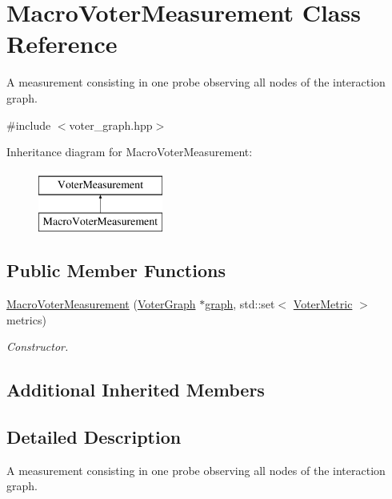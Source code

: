 \hypertarget{classMacroVoterMeasurement}{\section{Macro\-Voter\-Measurement Class Reference}
\label{classMacroVoterMeasurement}
}


A measurement consisting in one probe observing all nodes of the interaction graph.  




{\ttfamily \#include $<$voter\-\_\-graph.\-hpp$>$}

Inheritance diagram for Macro\-Voter\-Measurement\-:\begin{figure}[H]
\begin{center}
\leavevmode
\includegraphics[height=2.000000cm]{classMacroVoterMeasurement}
\end{center}
\end{figure}
\subsection*{Public Member Functions}
\begin{DoxyCompactItemize}
\item 
\hyperlink{classMacroVoterMeasurement_a5198644e81ae6561fd8d53e3a944328d}{Macro\-Voter\-Measurement} (\hyperlink{classVoterGraph}{Voter\-Graph} $\ast$\hyperlink{classVoterMeasurement_a8d22d4b78f7e2f4c747f5716c4885351}{graph}, std\-::set$<$ \hyperlink{voter__graph_8hpp_acb4c45a5ce4a55eee28e54e60409b9c5}{Voter\-Metric} $>$ metrics)
\begin{DoxyCompactList}\small\item\em Constructor. \end{DoxyCompactList}\end{DoxyCompactItemize}
\subsection*{Additional Inherited Members}


\subsection{Detailed Description}
A measurement consisting in one probe observing all nodes of the interaction graph. 

